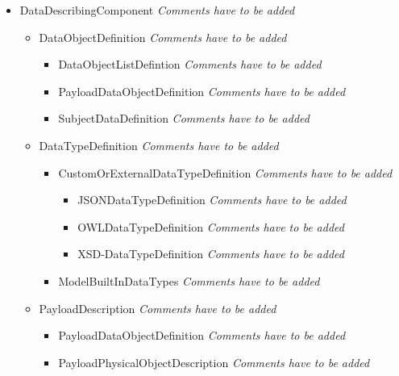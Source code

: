 \begin{itemize}
\begin{itemize}
	\item DataDescribingComponent \linebreak \textit{Comments have to be added}
	\begin{itemize}
		\item DataObjectDefinition \linebreak \textit{Comments have to be added}
		\begin{itemize}
			\item DataObjectListDefintion \linebreak \textit{Comments have to be added}
			\item PayloadDataObjectDefinition \linebreak \textit{Comments have to be added}
			\item SubjectDataDefinition \linebreak \textit{Comments have to be added}
		\end{itemize}
		\item DataTypeDefinition \linebreak \textit{Comments have to be added}
		\begin{itemize}
			\item CustomOrExternalDataTypeDefinition \linebreak \textit{Comments have to be added}
			\begin{itemize}
					\item JSONDataTypeDefinition \linebreak \textit{Comments have to be added}
					\item OWLDataTypeDefinition \linebreak \textit{Comments have to be added}
					\item XSD-DataTypeDefinition \linebreak \textit{Comments have to be added}
			\end{itemize}
			\item ModelBuiltInDataTypes \linebreak \textit{Comments have to be added}
		\end{itemize}
		\item PayloadDescription \linebreak \textit{Comments have to be added}
		\begin{itemize}
			\item PayloadDataObjectDefinition \linebreak \textit{Comments have to be added}
			\item PayloadPhysicalObjectDescription \linebreak \textit{Comments have to be added}

\end{itemize}
\end{itemize}
\end{itemize}
\end{itemize}
